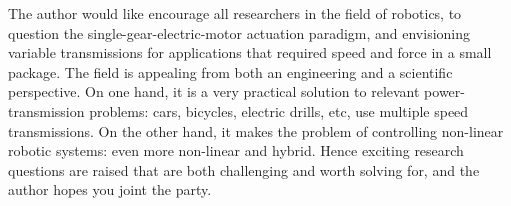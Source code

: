 The author would like encourage all researchers in the field of robotics, to question the single-gear-electric-motor actuation paradigm, and envisioning variable transmissions for applications that required speed and force in a small package. The field is appealing from both an engineering and a scientific perspective. On one hand, it is a very practical solution to relevant power-transmission problems: cars, bicycles, electric drills, etc, use multiple speed transmissions. On the other hand, it makes the problem of controlling non-linear robotic systems: even more non-linear and hybrid. Hence exciting research questions are raised that are both challenging and worth solving for, and the author hopes you joint the party. 






